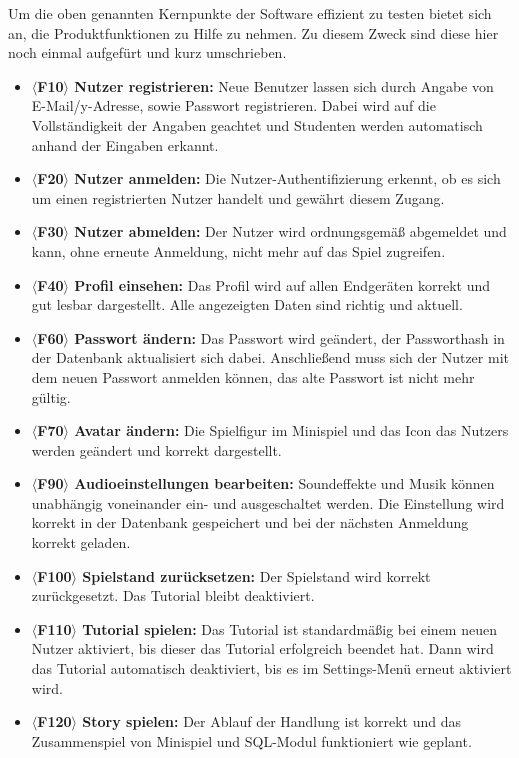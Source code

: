 Um die oben genannten Kernpunkte der Software effizient zu testen bietet sich an, die Produktfunktionen zu Hilfe zu nehmen. Zu diesem Zweck sind diese hier noch einmal aufgefürt und kurz umschrieben. 

\begin{itemize}
\item \textbf{$\langle$F10$\rangle$ Nutzer registrieren: }Neue Benutzer lassen sich durch Angabe von E-Mail/y-Adresse, sowie Passwort registrieren. Dabei wird auf die Vollständigkeit der Angaben geachtet und Studenten werden automatisch anhand der Eingaben erkannt.
\item \textbf{$\langle$F20$\rangle$ Nutzer anmelden: }Die Nutzer-Authentifizierung erkennt, ob es sich um einen registrierten Nutzer handelt und gewährt diesem Zugang.
\item \textbf{$\langle$F30$\rangle$ Nutzer abmelden: }Der Nutzer wird ordnungsgemäß abgemeldet und kann, ohne erneute Anmeldung, nicht mehr auf das Spiel zugreifen.
\item \textbf{$\langle$F40$\rangle$ Profil einsehen: }Das Profil wird auf allen Endgeräten korrekt und gut lesbar dargestellt. Alle angezeigten Daten sind richtig und aktuell.
\item \textbf{$\langle$F60$\rangle$ Passwort ändern: }Das Passwort wird geändert, der Passworthash in der Datenbank aktualisiert sich dabei. Anschließend muss sich der Nutzer mit dem neuen Passwort anmelden können, das alte Passwort ist nicht mehr gültig.
\item \textbf{$\langle$F70$\rangle$ Avatar ändern: }Die Spielfigur im Minispiel und das Icon das Nutzers werden geändert und korrekt dargestellt.
\item \textbf{$\langle$F90$\rangle$ Audioeinstellungen bearbeiten: }Soundeffekte und Musik können unabhängig voneinander ein- und ausgeschaltet werden. Die Einstellung wird korrekt in der Datenbank gespeichert und bei der nächsten Anmeldung korrekt geladen.
\item \textbf{$\langle$F100$\rangle$ Spielstand zurücksetzen: }Der Spielstand wird korrekt zurückgesetzt. Das Tutorial bleibt deaktiviert.
\item \textbf{$\langle$F110$\rangle$ Tutorial spielen: }Das Tutorial ist standardmäßig bei einem neuen Nutzer aktiviert, bis dieser das Tutorial erfolgreich beendet hat. Dann wird das Tutorial automatisch deaktiviert,  bis es im \glqq Settings\grqq-Menü erneut aktiviert wird.
\item \textbf{$\langle$F120$\rangle$ Story spielen: }Der Ablauf der Handlung ist korrekt und das Zusammenspiel von Minispiel und SQL-Modul funktioniert wie geplant.

\end{itemize}
